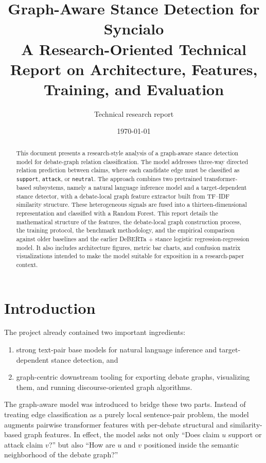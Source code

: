 \documentclass[11pt,a4paper]{article}
\title{Graph-Aware Stance Detection for Syncialo\\
\large A Research-Oriented Technical Report on Architecture, Features, Training, and Evaluation}
\author{Technical research report}
\date{\today}
\begin{document}
\maketitle

\begin{abstract}
This document presents a research-style analysis of a graph-aware stance detection model for debate-graph relation classification. The model addresses three-way directed relation prediction between claims, where each candidate edge must be classified as \texttt{support}, \texttt{attack}, or \texttt{neutral}. The approach combines two pretrained transformer-based subsystems, namely a natural language inference model and a target-dependent stance detector, with a debate-local graph feature extractor built from TF--IDF similarity structure. These heterogeneous signals are fused into a thirteen-dimensional representation and classified with a Random Forest. This report details the mathematical structure of the features, the debate-local graph construction process, the training protocol, the benchmark methodology, and the empirical comparison against older baselines and the earlier DeBERTa + stance logistic regression-regression model. It also includes architecture figures, metric bar charts, and confusion matrix visualizations intended to make the model suitable for exposition in a research-paper context.
\end{abstract}

\section{Introduction}
The project already contained two important ingredients:
\begin{enumerate}[label=\arabic*.]
  \item strong text-pair base models for natural language inference and target-dependent stance detection, and
  \item graph-centric downstream tooling for exporting debate graphs, visualizing them, and running discourse-oriented graph algorithms.
\end{enumerate}

The graph-aware model was introduced to bridge these two parts. Instead of treating edge classification as a purely local sentence-pair problem, the model augments pairwise transformer features with per-debate structural and similarity-based graph features. In effect, the model asks not only ``Does claim \(u\) support or attack claim \(v\)?'' but also ``How are \(u\) and \(v\) positioned inside the semantic neighborhood of the debate graph?''
\end{document}
